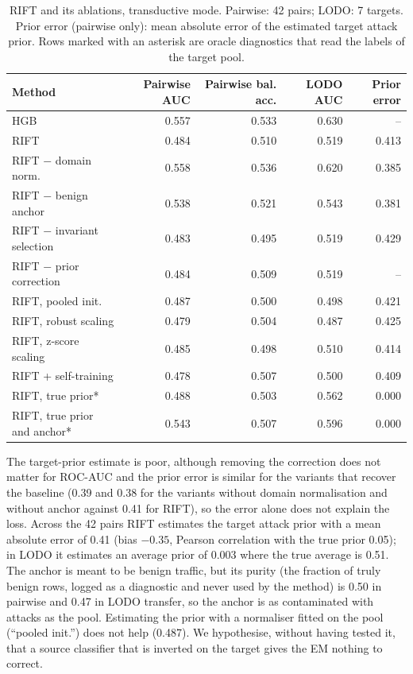 \documentclass[pdflatex,sn-mathphys-num]{sn-jnl}%
\begin{document}
\begin{table}[htbp]
\centering\small
\caption{RIFT and its ablations, transductive mode. Pairwise: 42 pairs; LODO: 7 targets. Prior error (pairwise only): mean absolute error of the estimated target attack prior. Rows marked with an asterisk are oracle diagnostics that read the labels of the target pool.}\label{tab:rift}
{\scriptsize\setlength{\tabcolsep}{2.5pt}\begin{tabular}{lrrrr}
\toprule
Method & Pairwise AUC & Pairwise bal. acc. & LODO AUC & Prior error \\
\midrule
HGB & 0.557 & 0.533 & 0.630 & -- \\
RIFT & 0.484 & 0.510 & 0.519 & 0.413 \\
RIFT $-$ domain norm. & 0.558 & 0.536 & 0.620 & 0.385 \\
RIFT $-$ benign anchor & 0.538 & 0.521 & 0.543 & 0.381 \\
RIFT $-$ invariant selection & 0.483 & 0.495 & 0.519 & 0.429 \\
RIFT $-$ prior correction & 0.484 & 0.509 & 0.519 & -- \\
RIFT, pooled init. & 0.487 & 0.500 & 0.498 & 0.421 \\
RIFT, robust scaling & 0.479 & 0.504 & 0.487 & 0.425 \\
RIFT, z-score scaling & 0.485 & 0.498 & 0.510 & 0.414 \\
RIFT + self-training & 0.478 & 0.507 & 0.500 & 0.409 \\
RIFT, true prior* & 0.488 & 0.503 & 0.562 & 0.000 \\
RIFT, true prior and anchor* & 0.543 & 0.507 & 0.596 & 0.000 \\
\bottomrule
\end{tabular}}
\end{table}

The target-prior estimate is poor, although removing the correction does not matter for ROC-AUC and the prior error is similar for the variants that recover the baseline (0.39 and 0.38 for the variants without domain normalisation and without anchor against 0.41 for RIFT), so the error alone does not explain the loss.
Across the 42 pairs RIFT estimates the target attack prior with a mean absolute error of 0.41 (bias $-0.35$, Pearson correlation with the true prior 0.05); in LODO it estimates an average prior of 0.003 where the true average is 0.51.
The anchor is meant to be benign traffic, but its purity (the fraction of truly benign rows, logged as a diagnostic and never used by the method) is 0.50 in pairwise and 0.47 in LODO transfer, so the anchor is as contaminated with attacks as the pool.
Estimating the prior with a normaliser fitted on the pool (``pooled init.'') does not help (0.487).
We hypothesise, without having tested it, that a source classifier that is inverted on the target gives the EM nothing to correct.
\end{document}
